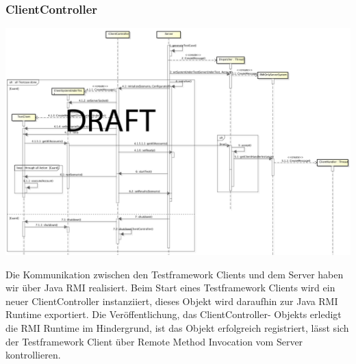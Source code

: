 \subsubsection{ClientController}
\label{sec:clientController}

\begin{center}
\includegraphics[scale=0.3]{image_testFramework/TestFWServerClientSeq.png}
\end{center}
 
Die Kommunikation zwischen den Testframework Clients und dem Server haben wir über Java RMI realisiert. Beim Start eines Testframework Clients wird ein neuer ClientController instanziiert, dieses Objekt wird daraufhin zur Java RMI Runtime exportiert. Die Veröffentlichung, das ClientController- Objekts erledigt die RMI Runtime im Hindergrund, ist das Objekt erfolgreich registriert, lässt sich der Testframework Client über Remote Method Invocation vom Server kontrollieren.

